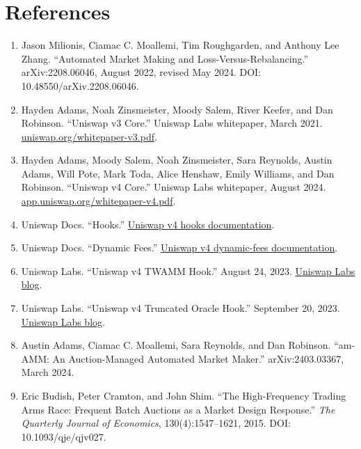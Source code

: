 \documentclass[11pt]{article}
\begin{document}
\clearpage
\section*{References}
\begin{enumerate}[leftmargin=0.25in]
\item Jason Milionis, Ciamac C. Moallemi, Tim Roughgarden, and Anthony Lee Zhang. ``Automated Market Making and Loss-Versus-Rebalancing.'' arXiv:2208.06046, August 2022, revised May 2024. DOI: 10.48550/arXiv.2208.06046.
\item Hayden Adams, Noah Zinsmeister, Moody Salem, River Keefer, and Dan Robinson. ``Uniswap v3 Core.'' Uniswap Labs whitepaper, March 2021. \href{https://uniswap.org/whitepaper-v3.pdf}{uniswap.org/whitepaper-v3.pdf}.
\item Hayden Adams, Moody Salem, Noah Zinsmeister, Sara Reynolds, Austin Adams, Will Pote, Mark Toda, Alice Henshaw, Emily Williams, and Dan Robinson. ``Uniswap v4 Core.'' Uniswap Labs whitepaper, August 2024. \href{https://app.uniswap.org/whitepaper-v4.pdf}{app.uniswap.org/whitepaper-v4.pdf}.
\item Uniswap Docs. ``Hooks.'' \href{https://developers.uniswap.org/docs/protocols/v4/concepts/hooks}{Uniswap v4 hooks documentation}.
\item Uniswap Docs. ``Dynamic Fees.'' \href{https://developers.uniswap.org/docs/protocols/v4/concepts/dynamic-fees}{Uniswap v4 dynamic-fees documentation}.
\item Uniswap Labs. ``Uniswap v4 TWAMM Hook.'' August 24, 2023. \href{https://blog.uniswap.org/v4-twamm-hook}{Uniswap Labs blog}.
\item Uniswap Labs. ``Uniswap v4 Truncated Oracle Hook.'' September 20, 2023. \href{https://blog.uniswap.org/uniswap-v4-truncated-oracle-hook}{Uniswap Labs blog}.
\item Austin Adams, Ciamac C. Moallemi, Sara Reynolds, and Dan Robinson. ``am-AMM: An Auction-Managed Automated Market Maker.'' arXiv:2403.03367, March 2024.
\item Eric Budish, Peter Cramton, and John Shim. ``The High-Frequency Trading Arms Race: Frequent Batch Auctions as a Market Design Response.'' \emph{The Quarterly Journal of Economics}, 130(4):1547--1621, 2015. DOI: 10.1093/qje/qjv027.
\end{enumerate}
\end{document}
